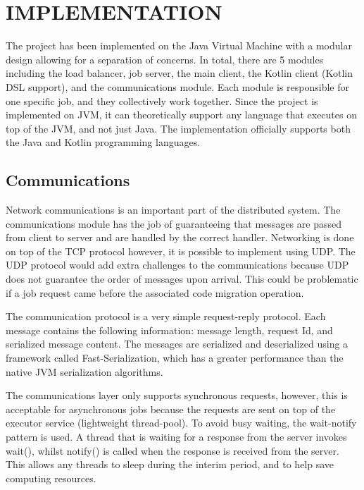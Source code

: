 \section{IMPLEMENTATION}\label{sec:impl}

The project has been implemented on the Java Virtual Machine with a modular design allowing for
a separation of concerns.
In total, there are 5 modules including the load balancer, job server, the main client,
the Kotlin client (Kotlin DSL support), and the communications module.
Each module is responsible for one specific job, and they collectively work together.
Since the project is implemented on JVM, it can theoretically support any language
that executes on top of the JVM, and not just Java.
The implementation officially supports both the Java and Kotlin programming languages.

\subsection{Communications}\label{subsec:communcations}

Network communications is an important part of the distributed system.
The communications module has the job of guaranteeing that messages
are passed from client to server and are handled by the correct handler.
Networking is done on top of the TCP protocol however, it is possible to
implement using UDP.
The UDP protocol would add extra challenges to the communications because
UDP does not guarantee the order of messages upon arrival.
This could be problematic if a job request came before the associated
code migration operation.

The communication protocol is a very simple request-reply protocol.
Each message contains the following information:
message length, request Id, and serialized message content.
The messages are serialized and deserialized using a framework called Fast-Serialization,
which has a greater performance than the native JVM serialization algorithms.

The communications layer only supports synchronous requests, however, this is acceptable
for asynchronous jobs because the requests are sent on top of the executor service (lightweight thread-pool).
To avoid busy waiting, the wait-notify pattern is used.
A thread that is waiting for a response from the server invokes wait(),
whilst notify() is called when the response is received from the server.
This allows any threads to sleep during the interim period, and to help
save computing resources.

